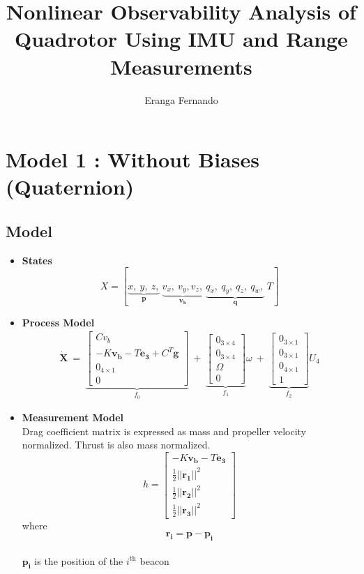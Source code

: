 \documentclass[]{article}
\title{Nonlinear Observability Analysis of Quadrotor Using IMU and Range Measurements}
\author{Eranga Fernando}
\begin{document}
\maketitle
\section{Model 1 : Without Biases (Quaternion)}
\subsection{Model}
\begin{itemize}
	\item \textbf{States}
	\begin{equation*}
		X = [\underbrace{x,\ y,\ z,}_{\bm{p}}\ \underbrace{v_x,\ v_y, v_z,}_{\bm{v_b}}\ \underbrace{q_x,\ q_y,\ q_z,\ q_w,}_{\bm{q}}\ T]
	\end{equation*}
	\item \textbf{Process Model}
	\begin{multline*}
		\dot{\bm{X}}\ =\ \underbrace{\begin{bmatrix}
		Cv_b\\
		-K\bm{v_b} -T\bm{e_3} + C^{T}\bm{g}\\
		0_{4\times 1}\\
		0
		\end{bmatrix}}_{f_0}
		\ +\ 
		\underbrace{\begin{bmatrix}
		0_{3\times 4}\\
		0_{3\times 4}\\
		\Omega\\
		0
		\end{bmatrix}}_{f_1}\omega
		\ +\ 
		\underbrace{\begin{bmatrix}
		0_{3\times 1}\\
		0_{3\times 1}\\
		0_{4\times 1}\\
		1
		\end{bmatrix}}_{f_2}U_4
	\end{multline*}
	\item \textbf{Measurement Model}\\
	Drag coefficient matrix is expressed as mass and propeller velocity normalized. Thrust is also mass normalized. 
	\begin{equation*}
		h = \begin{bmatrix}
		-K\bm{v_b} - T\bm{e_3}\\
		\frac{1}{2}\lvert\lvert \bm{r_1} \rvert\rvert^2\\
		\frac{1}{2}\lvert\lvert \bm{r_2} \rvert\rvert^2\\
		\frac{1}{2}\lvert\lvert \bm{r_3} \rvert\rvert^2
		\end{bmatrix}
	\end{equation*}
	where
	\begin{equation*}
	\bm{r_i} =  \bm{p}-\bm{p_i}
	\end{equation*}\\
	$\bm{p_i}$ is the position of the $i^\mathrm{th}$ beacon
\end{itemize}
\end{document}
